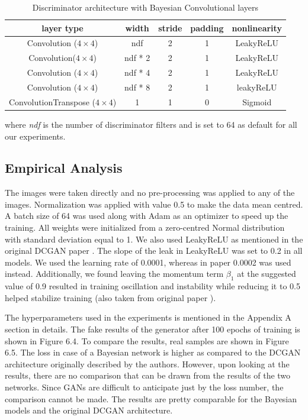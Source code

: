 \begin{table}[H]
    \centering
    \renewcommand{\arraystretch}{2}
    \begin{tabular}{c c c c c} 
 \hline
 layer type & width & stride & padding & nonlinearity \\ [0.5ex] 
 \hline
 Convolution ($4\times4$) & ndf & 2 & 1  & LeakyReLU \\ 
 

 Convolution($4\times4$) & ndf * 2 & 2 & 1  & LeakyReLU \\
 
 
 Convolution ($4\times4$) & ndf * 4 & 2 & 1 & LeakyReLU \\
 
 Convolution ($4\times4$) & ndf * 8 & 2 & 1  & leakyReLU \\
 
 ConvolutionTranspose ($4\times4$) & 1 & 1 & 0 & Sigmoid \\ [1ex] 
 \hline
\end{tabular}
\renewcommand{\arraystretch}{1}
\caption{Discriminator architecture with Bayesian Convolutional layers}
\label{tab:DiscriminatorArchitecture}
\end{table}

where \textit{ndf} is the number of discriminator filters and is set to 64 as default for all our experiments. 

\subsection{Empirical Analysis}

The images were taken directly and no pre-processing was applied to any of the images. Normalization was applied with value 0.5 to make the data mean centred. A batch size of 64 was used along with Adam \citep{kingma2014adam} as an optimizer to speed up the training. All weights were initialized from a zero-centred Normal distribution with standard deviation equal to 1. We also used LeakyReLU as mentioned in the original DCGAN paper \cite{DBLP:journals/corr/RadfordMC15}. The slope of the leak in LeakyReLU was set to 0.2 in all models. We used the learning rate of 0.0001, whereas in paper 0.0002 was used instead. Additionally, we found leaving the momentum term $\beta_1$ at the suggested value of 0.9 resulted in training oscillation and instability while reducing it to 0.5 helped stabilize training (also taken from original paper \cite{DBLP:journals/corr/RadfordMC15}).

The hyperparameters used in the experiments is mentioned in the Appendix A section in details.
The fake results of the generator after 100 epochs of training is shown in Figure 6.4. To compare the results, real samples are shown in Figure 6.5. The loss in case of a Bayesian network is higher as compared to the DCGAN architecture originally described by the authors. However, upon looking at the results, there are no comparison that can be drawn from the results of the two networks. Since GANs are difficult to anticipate just by the loss number, the comparison cannot be made. The results are pretty comparable for the Bayesian models and the original DCGAN architecture. 

